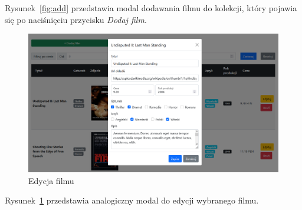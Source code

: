 \documentclass[
    12pt, %
]{fphw}
\begin{document}
    Rysunek~\ref{fig:add} przedstawia modal dodawania filmu do kolekcji, który pojawia się po naciśnięciu przycisku
    \textit{Dodaj film}.

    \begin{figure}[H]
        \includegraphics[width=\linewidth]{./assets/3.PNG}
        \caption{Edycja filmu}
        \label{fig:edit}
    \end{figure}

    Rysunek~\ref{fig:edit} przedstawia analogiczny modal do edycji wybranego filmu.

    \lstlistoflistings
    \listoffigures
    \listoftables
\end{document}
